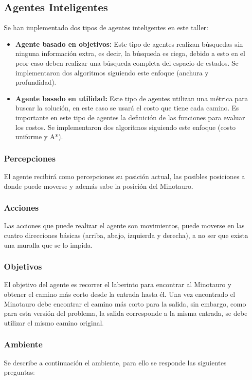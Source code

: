 \documentclass[letter, titlepage, 10pt]{article}
\begin{document}
\subsection{Agentes Inteligentes}

Se han implementado dos tipos de agentes inteligentes en este taller:
\begin{itemize}
  \item{\textbf{Agente basado en objetivos: }} Este tipo de agentes realizan búsquedas sin ninguna información extra, es decir, la búsqueda es ciega, debido a esto en el peor caso deben realizar una búsqueda completa del espacio de estados. Se implementaron dos algoritmos siguiendo este enfoque (anchura y profundidad).
  \item{\textbf{Agente basado en utilidad: }}  Este tipo de agentes utilizan una métrica para buscar la solución, en este caso se usará el costo que tiene cada camino. Es importante en este tipo de agentes la definición de las funciones para evaluar los costos. Se implementaron dos algoritmos siguiendo este enfoque (costo uniforme y A*).
\end{itemize}

\subsubsection{Percepciones}
El agente recibirá como percepciones su posición actual, las posibles posiciones a donde puede moverse y además sabe la posición del Minotauro. 

\subsubsection{Acciones}
Las acciones que puede realizar el agente son movimientos, puede moverse en las cuatro direcciones básicas (arriba, abajo, izquierda y derecha), a no ser que exista una muralla que se lo impida.

\subsubsection{Objetivos}
El objetivo del agente es recorrer el laberinto para encontrar al Minotauro y obtener el camino más corto desde la entrada hasta él. Una vez encontrado el Minotauro debe encontrar el camino más corto para la salida, sin embargo, como para esta versión del problema, la salida corresponde a la misma entrada, se debe utilizar el mismo camino original.

\subsubsection{Ambiente}
Se describe a continuación el ambiente, para ello se responde las siguientes preguntas:
\end{document}
